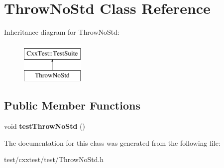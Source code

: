 \hypertarget{classThrowNoStd}{\section{Throw\-No\-Std Class Reference}
\label{classThrowNoStd}
}
Inheritance diagram for Throw\-No\-Std\-:\begin{figure}[H]
\begin{center}
\leavevmode
\includegraphics[height=2.000000cm]{classThrowNoStd}
\end{center}
\end{figure}
\subsection*{Public Member Functions}
\begin{DoxyCompactItemize}
\item 
\hypertarget{classThrowNoStd_a8986e0cad008372cafbb2945351afc65}{void {\bfseries test\-Throw\-No\-Std} ()}\label{classThrowNoStd_a8986e0cad008372cafbb2945351afc65}

\end{DoxyCompactItemize}


The documentation for this class was generated from the following file\-:\begin{DoxyCompactItemize}
\item 
test/cxxtest/test/Throw\-No\-Std.\-h\end{DoxyCompactItemize}
